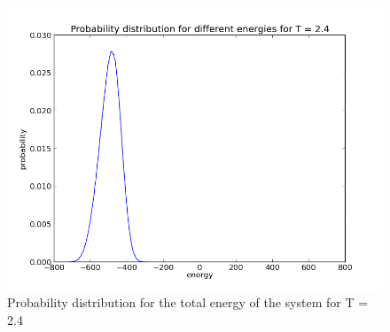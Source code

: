 \documentclass[a4paper,english, 10pt, twoside]{article}
\begin{document}
\begin{figure}[H]
 \centering
 \includegraphics[scale = 0.6]{probability_temp2dot4.png}
 \caption{Probability distribution for the total energy of the system for T = 2.4}
 \label{probability_temp2.4}
\end{figure}
\end{document}
